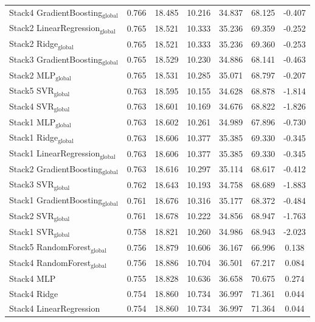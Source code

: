 \begin{table}[tp]
{\begin{tabular}{p{4.5cm}cccccc}
        Stack4 GradientBoosting$_{\text{global}}$ & 0.766 & 18.485 & 10.216 & 34.837 & 68.125 & -0.407 \\
        Stack2 LinearRegression$_{\text{global}}$ & 0.765 & 18.521 & 10.333 & 35.236 & 69.359 & -0.252 \\
        Stack2 Ridge$_{\text{global}}$ & 0.765 & 18.521 & 10.333 & 35.236 & 69.360 & -0.253 \\
        Stack3 GradientBoosting$_{\text{global}}$ & 0.765 & 18.529 & 10.230 & 34.886 & 68.141 & -0.463 \\
        Stack2 MLP$_{\text{global}}$ & 0.765 & 18.531 & 10.285 & 35.071 & 68.797 & -0.207 \\
        Stack5 SVR$_{\text{global}}$ & 0.763 & 18.595 & 10.155 & 34.628 & 68.878 & -1.814 \\
        Stack4 SVR$_{\text{global}}$ & 0.763 & 18.601 & 10.169 & 34.676 & 68.822 & -1.826 \\
        Stack1 MLP$_{\text{global}}$ & 0.763 & 18.602 & 10.261 & 34.989 & 67.896 & -0.730 \\
        Stack1 Ridge$_{\text{global}}$ & 0.763 & 18.606 & 10.377 & 35.385 & 69.330 & -0.345 \\
        Stack1 LinearRegression$_{\text{global}}$ & 0.763 & 18.606 & 10.377 & 35.385 & 69.330 & -0.345 \\
        Stack2 GradientBoosting$_{\text{global}}$ & 0.763 & 18.616 & 10.297 & 35.114 & 68.617 & -0.412 \\
        Stack3 SVR$_{\text{global}}$ & 0.762 & 18.643 & 10.193 & 34.758 & 68.689 & -1.883 \\
        Stack1 GradientBoosting$_{\text{global}}$ & 0.761 & 18.676 & 10.316 & 35.177 & 68.372 & -0.484 \\
        Stack2 SVR$_{\text{global}}$ & 0.761 & 18.678 & 10.222 & 34.856 & 68.947 & -1.763 \\
        Stack1 SVR$_{\text{global}}$ & 0.758 & 18.821 & 10.260 & 34.986 & 68.943 & -2.023 \\
        Stack5 RandomForest$_{\text{global}}$ & 0.756 & 18.879 & 10.606 & 36.167 & 66.996 & 0.138 \\
        Stack4 RandomForest$_{\text{global}}$ & 0.756 & 18.886 & 10.704 & 36.501 & 67.217 & 0.084 \\
        Stack4 MLP & 0.755 & 18.828 & 10.636 & 36.658 & 70.675 & 0.274 \\
        Stack4 Ridge & 0.754 & 18.860 & 10.734 & 36.997 & 71.361 & 0.044 \\
        Stack4 LinearRegression & 0.754 & 18.860 & 10.734 & 36.997 & 71.364 & 0.044 \\

\end{tabular}}
\end{table}
